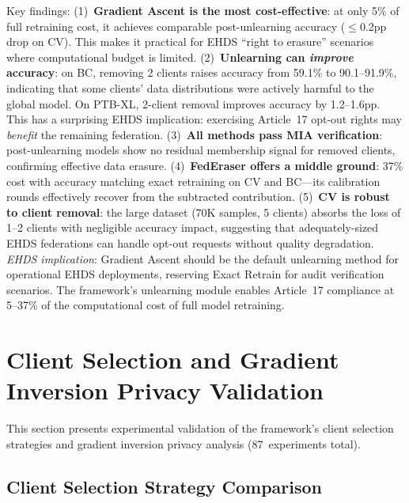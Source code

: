 \documentclass[conference,a4paper]{IEEEtran}
\begin{document}
\begin{table}[htbp]
\vspace{1mm}
\footnotesize{Key findings: (1)~\textbf{Gradient Ascent is the most cost-effective}: at only 5\% of full retraining cost, it achieves comparable post-unlearning accuracy ($\leq$0.2pp drop on CV). This makes it practical for EHDS ``right to erasure'' scenarios where computational budget is limited. (2)~\textbf{Unlearning can \textit{improve} accuracy}: on BC, removing 2 clients raises accuracy from 59.1\% to 90.1--91.9\%, indicating that some clients' data distributions were actively harmful to the global model. On PTB-XL, 2-client removal improves accuracy by 1.2--1.6pp. This has a surprising EHDS implication: exercising Article~17 opt-out rights may \textit{benefit} the remaining federation. (3)~\textbf{All methods pass MIA verification}: post-unlearning models show no residual membership signal for removed clients, confirming effective data erasure. (4)~\textbf{FedEraser offers a middle ground}: 37\% cost with accuracy matching exact retraining on CV and BC---its calibration rounds effectively recover from the subtracted contribution. (5)~\textbf{CV is robust to client removal}: the large dataset (70K samples, 5 clients) absorbs the loss of 1--2 clients with negligible accuracy impact, suggesting that adequately-sized EHDS federations can handle opt-out requests without quality degradation. \textit{EHDS implication}: Gradient Ascent should be the default unlearning method for operational EHDS deployments, reserving Exact Retrain for audit verification scenarios. The framework's unlearning module enables Article~17 compliance at 5--37\% of the computational cost of full model retraining.}
\end{table}

\section{Client Selection and Gradient Inversion Privacy Validation}
\label{sec:cascade5}

This section presents experimental validation of the framework's client selection strategies and gradient inversion privacy analysis (87~experiments total).

\subsection{Client Selection Strategy Comparison}
\label{sec:client_selection}
\end{document}
